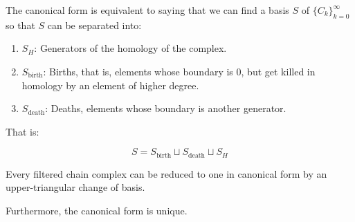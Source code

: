 \begin{remark}
\label{canonicalformsplit}
The canonical form is equivalent to saying that we can find a basis $S$ 
of $\{C_k\}_{k=0}^{\infty}$ so that $S$
can be separated into: 
\begin{enumerate}
\item $S_H$: Generators of the homology of the complex.

\item $S_{\text{birth}}$: Births, that is, elements whose boundary is $0$, but get killed in homology by an element of higher degree.

\item $S_{\text{death}}$: Deaths, elements whose boundary is another generator. 
\end{enumerate}

That is:

$$
S=S_{\text{birth}}\sqcup
S_{\text{death}}\sqcup
 S_H
$$ 
\end{remark}

\begin{theorem}
\cite{bar1994}
Every filtered chain complex can be reduced to 
one in canonical form by an upper-triangular change of basis.

Furthermore, the canonical form is unique.
\end{theorem}

